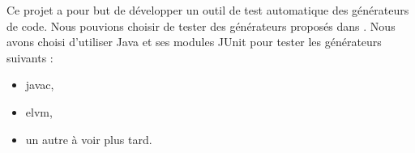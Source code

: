 \hspace{15pt}

Ce projet a pour but de développer un outil de test automatique des générateurs de code. Nous pouvions choisir de tester des générateurs proposés dans \cite{liste_generateurs}. Nous avons choisi d'utiliser Java et ses modules JUnit pour tester les générateurs suivants :

\begin{itemize}
    \item javac,
    \item elvm,
    \item un autre à voir plus tard.
\end{itemize}
